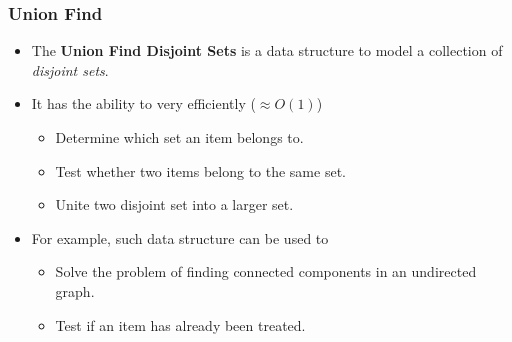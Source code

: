 \documentclass{beamer}
\begin{document}
\begin{frame}%
\frametitle{Union Find}

\begin{itemize}

\item The \textbf{Union Find Disjoint Sets} is a data structure to model a collection of \emph{disjoint sets}.
\vspace{0.3cm}
\item<2-> It has the ability to very efficiently ($\approx O(1)$)
\begin{itemize}
\item<2-> Determine which set an item belongs to.
\item<2-> Test whether two items belong to the same set.
\item<2-> Unite two disjoint set into a larger set.
\end{itemize}
\vspace{0.3cm}
\item<3-> For example, such data structure can be used to
\begin{itemize}
\item<3-> Solve the problem of finding connected components in an undirected graph.
\item<3-> Test if an item has already been treated.
\end{itemize}

\end{itemize}

\end{frame}
\end{document}
